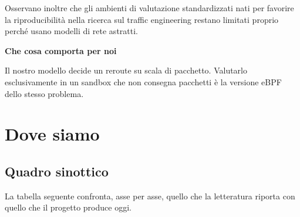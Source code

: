 \documentclass[11pt,a4paper,oneside]{report}
\newcommand{\verdetto}[2]{%
  \par\vspace{4pt}%
  \noindent\colorbox{boxbg}{%
    \begin{minipage}{\dimexpr\linewidth-2\fboxsep}%
      \vspace{3pt}\textbf{\color{accent}#1}\par\vspace{2pt}#2\vspace{3pt}%
    \end{minipage}}%
  \par\vspace{6pt}}
\begin{document}
Osservano inoltre che gli ambienti di valutazione standardizzati nati
per favorire la riproducibilità nella ricerca sul traffic engineering
restano limitati proprio perché usano modelli di rete astratti.

\verdetto{Che cosa comporta per noi}{Il nostro modello decide un
reroute su scala di pacchetto. Valutarlo esclusivamente in un sandbox
che non consegna pacchetti è la versione eBPF dello stesso problema.}

\chapter{Dove siamo}
\label{ch:noi}

\section{Quadro sinottico}

La tabella seguente confronta, asse per asse, quello che la letteratura
riporta con quello che il progetto produce oggi.
\end{document}
